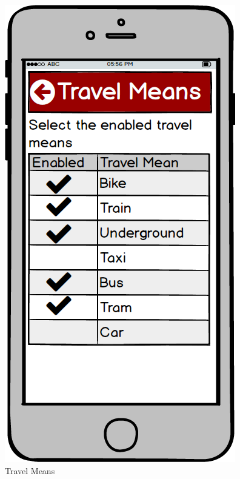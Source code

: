 \begin{figure}[!htb]
\begin{minipage}[b]{0.3\textwidth}
	\includegraphics[scale=0.3]{images/TravelMeans}
	\caption{Travel Means}
	\label{ref:travelMeans}
\end{minipage}
\end{figure}


